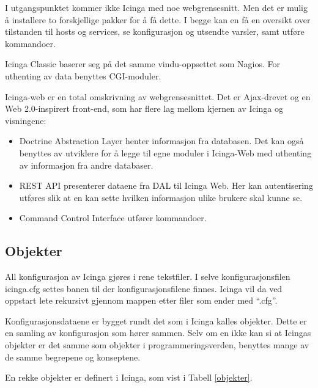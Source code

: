 I utgangspunktet kommer ikke Icinga med noe webgrensesnitt. Men det er mulig å installere to forskjellige pakker for å få dette. I begge kan en få en oversikt over tilstanden til hosts og services, se konfigurasjon og utsendte varsler, samt utføre kommandoer.

Icinga Classic baserer seg på det samme vindu-oppsettet som Nagios. For uthenting av data benyttes CGI-moduler.

Icinga-web er en total omskrivning av webgrensesnittet. Det er Ajax-drevet og en Web 2.0-inspirert front-end, som har flere lag mellom kjernen av Icinga og visningene:

\begin{itemize}
	\item Doctrine Abstraction Layer henter informasjon fra databasen. Det kan også benyttes av utviklere for å legge til egne moduler i Icinga-Web med uthenting av informasjon fra andre databaser.
	\item REST API presenterer dataene fra DAL til Icinga Web. Her kan autentisering utføres slik at en kan sette hvilken informasjon ulike brukere skal kunne se.
	\item Command Control Interface utfører kommandoer.
\end{itemize}

\subsection{Objekter}
All konfigurasjon av Icinga gjøres i rene tekstfiler. I selve konfigurasjonsfilen icinga.cfg settes banen til der konfigurasjonsfilene finnes. Icinga vil da ved oppstart lete rekursivt gjennom mappen etter filer som ender med “.cfg”.

Konfigurasjonsdataene er bygget rundt det som i Icinga kalles objekter. Dette er en samling av konfigurasjon som hører sammen. Selv om en ikke kan si at Icingas objekter er det samme som objekter i programmeringsverden, benyttes mange av de samme begrepene og konseptene.

En rekke objekter er definert i Icinga, som vist i Tabell \ref{objekter}.

